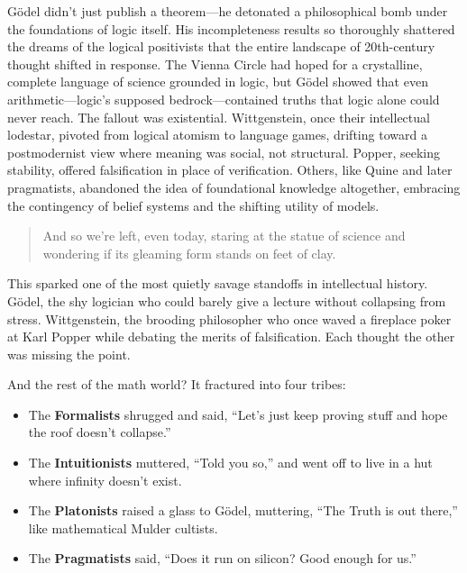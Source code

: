 Gödel didn’t just publish a theorem—he detonated a philosophical bomb under the foundations of logic itself. His incompleteness results so thoroughly shattered the dreams of the logical positivists that the entire landscape of 20th-century thought shifted in response. The Vienna Circle had hoped for a crystalline, complete language of science grounded in logic, but Gödel showed that even arithmetic—logic’s supposed bedrock—contained truths that logic alone could never reach. The fallout was existential. Wittgenstein, once their intellectual lodestar, pivoted from logical atomism to language games, drifting toward a postmodernist view where meaning was social, not structural. Popper, seeking stability, offered falsification in place of verification. Others, like Quine and later pragmatists, abandoned the idea of foundational knowledge altogether, embracing the contingency of belief systems and the shifting utility of models. 

\begin{quote}
And so we’re left, even today, staring at the statue of science and wondering if its gleaming form stands on feet of clay.
\end{quote}


This sparked one of the most quietly savage standoffs in intellectual history. Gödel, the shy logician who could barely give a lecture without collapsing from stress. Wittgenstein, the brooding philosopher who once waved a fireplace poker at Karl Popper while debating the merits of falsification. Each thought the other was missing the point. 

And the rest of the math world? It fractured into four tribes:

\begin{itemize}
    \item The \textbf{Formalists} shrugged and said, “Let’s just keep proving stuff and hope the roof doesn’t collapse.”
    \item The \textbf{Intuitionists} muttered, “Told you so,” and went off to live in a hut where infinity doesn’t exist.
    \item The \textbf{Platonists} raised a glass to Gödel, muttering, “The Truth is out there,” like mathematical Mulder cultists.
    \item The \textbf{Pragmatists} said, “Does it run on silicon? Good enough for us.”
\end{itemize}


\medskip

